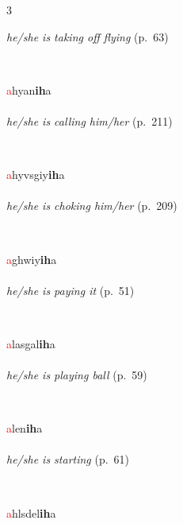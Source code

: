 \documentclass[oneside,openany]{book}%
\begin{document}
\begin{multicols}{3}
\begin{minipage}[t]{\linewidth}
\noindent \textit{he/she is taking off flying} (p.~63)
\end{minipage}\\[1em]%
\begin{minipage}[t]{\linewidth}
\raggedright\noindent \textcolor{Red}{a}hyan\textbf{ih}a\\
\\
\noindent \textit{he/she is calling him/her} (p.~211)
\end{minipage}\\[1em]%
\begin{minipage}[t]{\linewidth}
\raggedright\noindent \textcolor{Red}{a}hyvsgiy\textbf{ih}a\\
\\
\noindent \textit{he/she is choking him/her} (p.~209)
\end{minipage}\\[1em]%
\begin{minipage}[t]{\linewidth}
\raggedright\noindent \textcolor{Red}{a}ghwiy\textbf{ih}a\\
\\
\noindent \textit{he/she is paying it} (p.~51)
\end{minipage}\\[1em]%
\begin{minipage}[t]{\linewidth}
\raggedright\noindent \textcolor{Red}{a}lasgal\textbf{ih}a\\
\\
\noindent \textit{he/she is playing ball} (p.~59)
\end{minipage}\\[1em]%
\begin{minipage}[t]{\linewidth}
\raggedright\noindent \textcolor{Red}{a}len\textbf{ih}a\\
\\
\noindent \textit{he/she is starting} (p.~61)
\end{minipage}\\[1em]%
\begin{minipage}[t]{\linewidth}
\raggedright\noindent \textcolor{Red}{a}hlsdel\textbf{ih}a\\
\\

\end{minipage}
\end{multicols}
\end{document}
